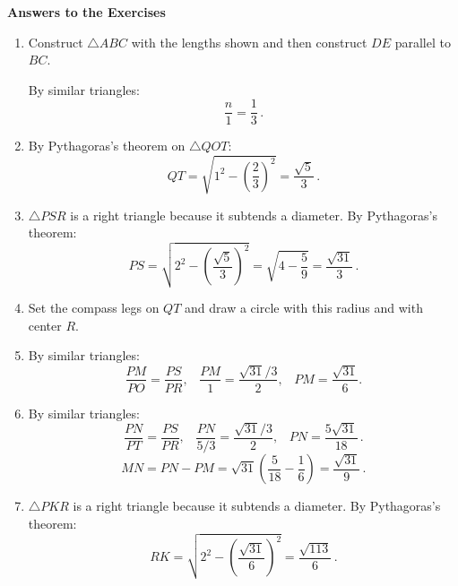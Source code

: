 \newpage

\begin{center}
\textbf{\Large Answers to the Exercises}
\end{center}

\begin{enumerate}

\item Construct $\triangle ABC$ with the lengths shown and then construct $DE$ parallel to $BC$. 
\vspace*{-1ex}
\begin{center}
\end{center}
By similar triangles:
\[
\frac{n}{1} = \frac{1}{3}\,.
\]

\item By Pythagoras's theorem on $\triangle QOT$:
\[
QT = \sqrt{1^2-\left(\frac{2}{3}\right)^2}=\frac{\sqrt{5}}{3}\,.
\]

\item $\triangle PSR$ is a right triangle because it subtends a diameter. By Pythagoras's theorem:
\[
PS = \sqrt{2^2-\left(\frac{\sqrt{5}}{3}\right)^2}=\sqrt{4-\frac{5}{9}}=\frac{\sqrt{31}}{3}\,.
\]

\item Set the compass legs on $QT$ and draw a circle with this radius and with center $R$.

\item By similar triangles:
\[
\frac{PM}{PO}=\frac{PS}{PR},\;\;\;\frac{PM}{1}=\frac{\sqrt{31}/3}{2},\;\;\;PM=\frac{\sqrt{31}}{6}.
\]

\item By similar triangles:
\[
\frac{PN}{PT}=\frac{PS}{PR},\;\;\;\frac{PN}{5/3}=\frac{\sqrt{31}/3}{2},\;\;\;PN=\frac{5\sqrt{31}}{18}\,.
\]
\[
MN=PN-PM = \sqrt{31}\left(\frac{5}{18}-\frac{1}{6}\right) = \frac{\sqrt{31}}{9}\,.
\]

\item $\triangle PKR$ is a right triangle because it subtends a diameter. By Pythagoras's theorem:
\[
RK=\sqrt{2^2-\left(\frac{\sqrt{31}}{6}\right)^2} = \frac{\sqrt{113}}{6}\,.
\]


\end{enumerate}
